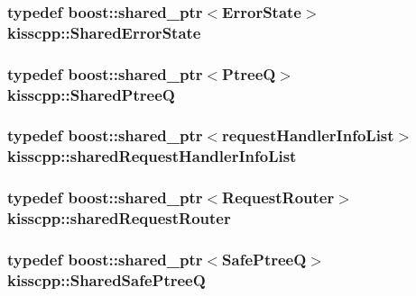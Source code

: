 \hypertarget{a00089_af77de115307b379cbcab83a1fc54fdad}{
\subsubsection[{Shared\-Error\-State}]{\setlength{\rightskip}{0pt plus 5cm}typedef boost\-::shared\-\_\-ptr$<${\bf Error\-State}$>$ {\bf kisscpp\-::\-Shared\-Error\-State}}}\label{a00089_af77de115307b379cbcab83a1fc54fdad}
\hypertarget{a00089_aecf9f29bb4c41e0d4dbc74731a3020cd}{
\subsubsection[{Shared\-Ptree\-Q}]{\setlength{\rightskip}{0pt plus 5cm}typedef boost\-::shared\-\_\-ptr$<${\bf Ptree\-Q}$>$ {\bf kisscpp\-::\-Shared\-Ptree\-Q}}}\label{a00089_aecf9f29bb4c41e0d4dbc74731a3020cd}
\hypertarget{a00089_aa107348bd263ff2c9358b497155d37b8}{
\subsubsection[{shared\-Request\-Handler\-Info\-List}]{\setlength{\rightskip}{0pt plus 5cm}typedef boost\-::shared\-\_\-ptr$<${\bf request\-Handler\-Info\-List}$>$ {\bf kisscpp\-::shared\-Request\-Handler\-Info\-List}}}\label{a00089_aa107348bd263ff2c9358b497155d37b8}
\hypertarget{a00089_a203bb476deb3940ecd3f21668dd3cdff}{
\subsubsection[{shared\-Request\-Router}]{\setlength{\rightskip}{0pt plus 5cm}typedef boost\-::shared\-\_\-ptr$<${\bf Request\-Router}$>$ {\bf kisscpp\-::shared\-Request\-Router}}}\label{a00089_a203bb476deb3940ecd3f21668dd3cdff}
\hypertarget{a00089_ae95e969e7f5dfd1f36842ac9aa25c7ea}{
\subsubsection[{Shared\-Safe\-Ptree\-Q}]{\setlength{\rightskip}{0pt plus 5cm}typedef boost\-::shared\-\_\-ptr$<${\bf Safe\-Ptree\-Q}$>$ {\bf kisscpp\-::\-Shared\-Safe\-Ptree\-Q}}}\label{a00089_ae95e969e7f5dfd1f36842ac9aa25c7ea}

